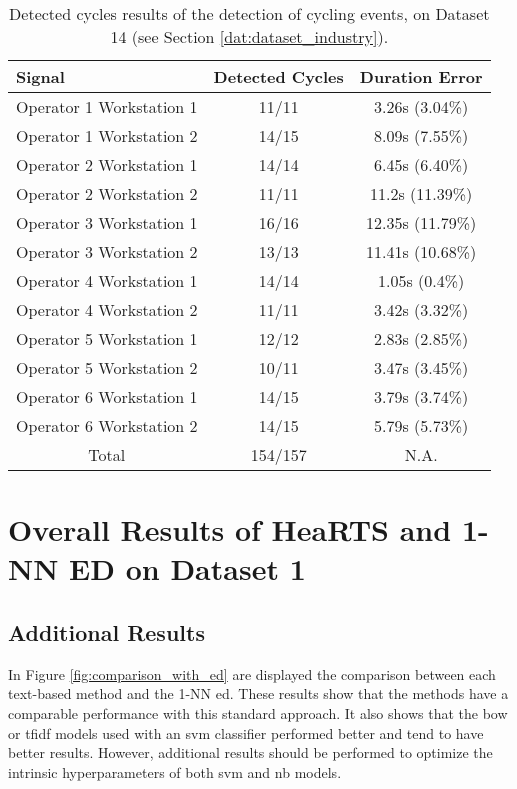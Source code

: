 \begin{table}
\centering
\caption{Detected cycles results of the detection of cycling events, on Dataset 14 (see Section \ref{dat:dataset_industry}).}
\label{tab:wc_results}
\begin{tabular}{lcc} 
\toprule
Signal & Detected Cycles & Duration Error\\ 
\midrule
Operator 1 Workstation 1 & 11/11 & 3.26s (3.04\%)\\
Operator 1 Workstation 2 & 14/15 & 8.09s (7.55\%)\\
Operator 2 Workstation 1 & 14/14 & 6.45s (6.40\%)\\
Operator 2 Workstation 2 & 11/11 & 11.2s (11.39\%)\\
Operator 3 Workstation 1 & 16/16 & 12.35s (11.79\%)\\
Operator 3 Workstation 2 & 13/13 & 11.41s (10.68\%)\\
Operator 4 Workstation 1 & 14/14 & 1.05s (0.4\%)\\
Operator 4 Workstation 2 & 11/11 & 3.42s (3.32\%)\\
Operator 5 Workstation 1 & 12/12 & 2.83s (2.85\%)\\
Operator 5 Workstation 2 & 10/11 & 3.47s (3.45\%)\\
Operator 6 Workstation 1 & 14/15 & 3.79s (3.74\%)\\
Operator 6 Workstation 2 & 14/15 & 5.79s (5.73\%)\\
\midrule
\multicolumn{1}{c}{Total} & 154/157 & N.A.\\
\bottomrule
\end{tabular}
\end{table}

\section{Overall Results of HeaRTS and 1-NN ED on Dataset 1}
\label{app:overall_ucr_results}

\subsection{Additional Results}

In Figure \ref{fig:comparison_with_ed} are displayed the comparison between each text-based method and the 1-NN \gls{ed}. These results show that the methods have a comparable performance with this standard approach. It also shows that the \gls{bow} or \gls{tfidf} models used with an \gls{svm} classifier performed better and tend to have better results. However, additional results should be performed to optimize the intrinsic hyperparameters of both \gls{svm} and \gls{nb} models.

